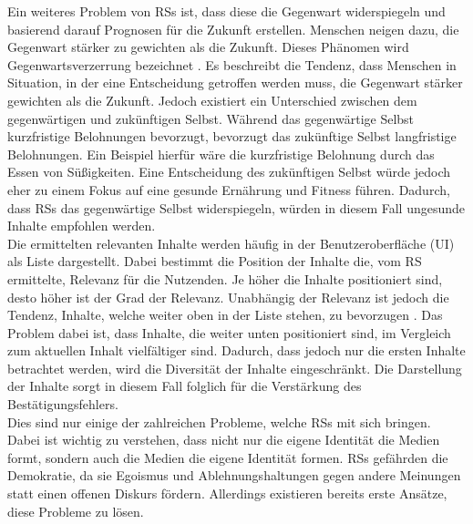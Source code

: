 Ein weiteres Problem von \acp{RS} ist, dass diese die Gegenwart widerspiegeln und basierend darauf Prognosen für die Zukunft erstellen.
Menschen neigen dazu, die Gegenwart stärker zu gewichten als die Zukunft.
Dieses Phänomen wird Gegenwartsverzerrung bezeichnet \cite{present-bias}.
Es beschreibt die Tendenz, dass Menschen in Situation, in der eine Entscheidung getroffen werden muss, die Gegenwart stärker gewichten als die Zukunft.
Jedoch existiert ein Unterschied zwischen dem gegenwärtigen und zukünftigen Selbst.
Während das gegenwärtige Selbst kurzfristige Belohnungen bevorzugt, bevorzugt das zukünftige Selbst langfristige Belohnungen.
Ein Beispiel hierfür wäre die kurzfristige Belohnung durch das Essen von Süßigkeiten.
Eine Entscheidung des zukünftigen Selbst würde jedoch eher zu einem Fokus auf eine gesunde Ernährung und Fitness führen.
Dadurch, dass \acp{RS} das gegenwärtige Selbst widerspiegeln, würden in diesem Fall ungesunde Inhalte empfohlen werden. \\

Die ermittelten relevanten Inhalte werden häufig in der Benutzeroberfläche (\ac{UI}) als Liste dargestellt.
Dabei bestimmt die Position der Inhalte die, vom \ac{RS} ermittelte, Relevanz für die Nutzenden.
Je höher die Inhalte positioniert sind, desto höher ist der Grad der Relevanz.
Unabhängig der Relevanz ist jedoch die Tendenz, Inhalte, welche weiter oben in der Liste stehen, zu bevorzugen \cite{position-bias}.
Das Problem dabei ist, dass Inhalte, die weiter unten positioniert sind, im Vergleich zum aktuellen Inhalt vielfältiger sind.
Dadurch, dass jedoch nur die ersten Inhalte betrachtet werden, wird die Diversität der Inhalte eingeschränkt.
Die Darstellung der Inhalte sorgt in diesem Fall folglich für die Verstärkung des Bestätigungsfehlers. \\

Dies sind nur einige der zahlreichen Probleme, welche \acp{RS} mit sich bringen.
Dabei ist wichtig zu verstehen, dass nicht nur die eigene Identität die Medien formt, sondern auch die Medien die eigene Identität formen.
\acp{RS} gefährden die Demokratie, da sie Egoismus und Ablehnungshaltungen gegen andere Meinungen statt einen offenen Diskurs fördern.
Allerdings existieren bereits erste Ansätze, diese Probleme zu lösen. \\

